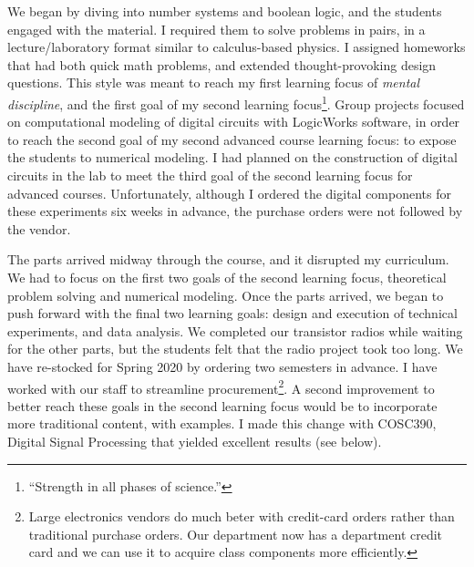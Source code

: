 \documentclass[../../../main.tex]{subfiles}
\begin{document}
We began by diving into number systems and boolean logic, and the students engaged with the material.  I required them to solve problems in pairs, in a lecture/laboratory format similar to calculus-based physics.  I assigned homeworks that had both quick math problems, and extended thought-provoking design questions.  This style was meant to reach my first learning focus of \textit{mental discipline}, and the first goal of my second learning focus\footnote{``Strength in all phases of science.''}.  Group projects focused on computational modeling of digital circuits with LogicWorks software, in order to reach the second goal of my second advanced course learning focus: to expose the students to numerical modeling.  I had planned on the construction of digital circuits in the lab to meet the third goal of the second learning focus for advanced courses.  Unfortunately, although I ordered the digital components for these experiments six weeks in advance, the purchase orders were not followed by the vendor.  \\ \hspace{0.1cm} 

The parts arrived midway through the course, and it disrupted my curriculum.  We had to focus on the first two goals of the second learning focus, theoretical problem solving and numerical modeling.  Once the parts arrived, we began to push forward with the final two learning goals: design and execution of technical experiments, and data analysis.  We completed our transistor radios while waiting for the other parts, but the students felt that the radio project took too long.  We have re-stocked for Spring 2020 by ordering two semesters in advance.  I have worked with our staff to streamline procurement\footnote{Large electronics vendors do much beter with credit-card orders rather than traditional purchase orders.  Our department now has a department credit card and we can use it to acquire class components more efficiently.}.  A second improvement to better reach these goals in the second learning focus would be to incorporate more traditional content, with examples.  I made this change with COSC390, Digital Signal Processing that yielded excellent results (see below).\\ \hspace{0.1cm}
\end{document}
